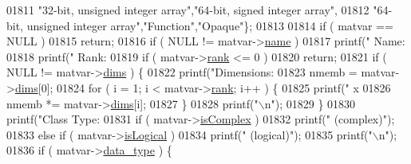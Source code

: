 \begin{DoxyCode}
{{{{{{{{{{{{{{{{{{{{{{{{{{{{{{01811        \textcolor{stringliteral}{"32-bit, unsigned integer array"},\textcolor{stringliteral}{"64-bit, signed integer array"},
01812        \textcolor{stringliteral}{"64-bit, unsigned integer array"},\textcolor{stringliteral}{"Function"},\textcolor{stringliteral}{"Opaque"}\};
01813 
01814     \textcolor{keywordflow}{if} ( matvar == NULL )
01815         \textcolor{keywordflow}{return};
01816     \textcolor{keywordflow}{if} ( NULL != matvar->\hyperlink{group___m_a_t_a5d4b55b041e3b4fb50c04337f05ad909}{name} )
01817         printf(\textcolor{stringliteral}{"      Name: %
01818     printf(\textcolor{stringliteral}{"      Rank: %
01819     \textcolor{keywordflow}{if} ( matvar->\hyperlink{group___m_a_t_a84ba70c96ded13cc555fa75b768d9921}{rank} <= 0 )
01820         \textcolor{keywordflow}{return};
01821     \textcolor{keywordflow}{if} ( NULL != matvar->\hyperlink{group___m_a_t_a8e01234e1c862ce3472bb37f5a09b92c}{dims} ) \{
01822         printf(\textcolor{stringliteral}{"Dimensions: %
01823         nmemb = matvar->\hyperlink{group___m_a_t_a8e01234e1c862ce3472bb37f5a09b92c}{dims}[0];
01824         \textcolor{keywordflow}{for} ( i = 1; i < matvar->\hyperlink{group___m_a_t_a84ba70c96ded13cc555fa75b768d9921}{rank}; i++ ) \{
01825             printf(\textcolor{stringliteral}{" x %
01826             nmemb *= matvar->\hyperlink{group___m_a_t_a8e01234e1c862ce3472bb37f5a09b92c}{dims}[i];
01827         \}
01828         printf(\textcolor{stringliteral}{"\(\backslash\)n"});
01829     \}
01830     printf(\textcolor{stringliteral}{"Class Type: %
01831     \textcolor{keywordflow}{if} ( matvar->\hyperlink{group___m_a_t_aeb03b3a69f108dc05470b00443a43739}{isComplex} )
01832         printf(\textcolor{stringliteral}{" (complex)"});
01833     \textcolor{keywordflow}{else} \textcolor{keywordflow}{if} ( matvar->\hyperlink{group___m_a_t_a866c1539e68073a837833d74cd4a65be}{isLogical} )
01834         printf(\textcolor{stringliteral}{" (logical)"});
01835     printf(\textcolor{stringliteral}{"\(\backslash\)n"});
01836     \textcolor{keywordflow}{if} ( matvar->\hyperlink{group___m_a_t_ab6aafe9bd77f0f077852593dec438144}{data\_type} ) \{
}}}}}}}}}}}}}}}}}}}}}}}}}}}}}}}}}}}
\end{DoxyCode}
